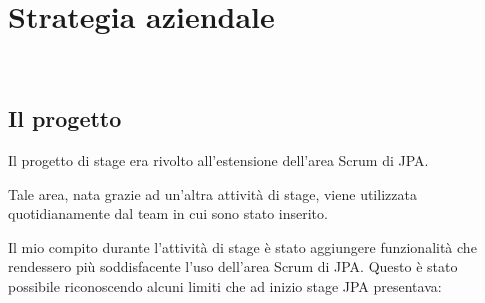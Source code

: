 
\chapter{Strategia aziendale}
\label{cap:strat-aziend}

\\

\section{Il progetto}\label{sec:strat-prog}

Il progetto di stage era rivolto all'estensione dell'area Scrum di JPA.

Tale area, nata grazie ad un'altra attività di stage, viene utilizzata
quotidianamente dal team in cui sono stato inserito.

Il mio compito durante l'attività di stage è stato aggiungere funzionalità
che rendessero più soddisfacente l'uso dell'area Scrum di JPA. Questo è stato
possibile riconoscendo alcuni limiti che ad inizio stage JPA presentava:

